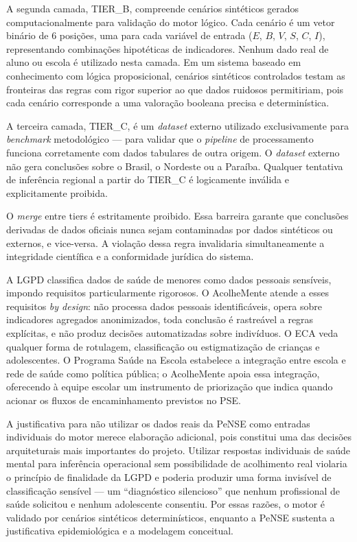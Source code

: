 \documentclass[
    12pt,
    openright,
    oneside,
    a4paper,
    english,
    brazil
]{abntex2}
\begin{document}
A segunda camada, TIER\_B, compreende cen\'arios sint\'eticos gerados computacionalmente para valida\c{c}\~ao do motor l\'ogico. Cada cen\'ario \'e um vetor bin\'ario de 6 posi\c{c}\~oes, uma para cada vari\'avel de entrada ($E$, $B$, $V$, $S$, $C$, $I$), representando combina\c{c}\~oes hipot\'eticas de indicadores. Nenhum dado real de aluno ou escola \'e utilizado nesta camada. Em um sistema baseado em conhecimento com l\'ogica proposicional, cen\'arios sint\'eticos controlados testam as fronteiras das regras com rigor superior ao que dados ruidosos permitiriam, pois cada cen\'ario corresponde a uma valora\c{c}\~ao booleana precisa e determin\'istica.

A terceira camada, TIER\_C, \'e um \textit{dataset} externo utilizado exclusivamente para \textit{benchmark} metodol\'ogico --- para validar que o \textit{pipeline} de processamento funciona corretamente com dados tabulares de outra origem. O \textit{dataset} externo n\~ao gera conclus\~oes sobre o Brasil, o Nordeste ou a Para\'iba. Qualquer tentativa de infer\^encia regional a partir do TIER\_C \'e logicamente inv\'alida e explicitamente proibida.

O \textit{merge} entre tiers \'e estritamente proibido. Essa barreira garante que conclus\~oes derivadas de dados oficiais nunca sejam contaminadas por dados sint\'eticos ou externos, e vice-versa. A viola\c{c}\~ao dessa regra invalidaria simultaneamente a integridade cient\'ifica e a conformidade jur\'idica do sistema.

A LGPD \cite{brasil_lgpd_2018} classifica dados de sa\'ude de menores como dados pessoais sens\'iveis, impondo requisitos particularmente rigorosos. O AcolheMente atende a esses requisitos \textit{by design}: n\~ao processa dados pessoais identific\'aveis, opera sobre indicadores agregados anonimizados, toda conclus\~ao \'e rastre\'avel a regras expl\'icitas, e n\~ao produz decis\~oes automatizadas sobre indiv\'iduos. O ECA \cite{brasil_eca_1990} veda qualquer forma de rotulagem, classifica\c{c}\~ao ou estigmatiza\c{c}\~ao de crian\c{c}as e adolescentes. O Programa Sa\'ude na Escola \cite{brasil_pse_2007} estabelece a integra\c{c}\~ao entre escola e rede de sa\'ude como pol\'itica p\'ublica; o AcolheMente apoia essa integra\c{c}\~ao, oferecendo \`a equipe escolar um instrumento de prioriza\c{c}\~ao que indica quando acionar os fluxos de encaminhamento previstos no PSE.

A justificativa para n\~ao utilizar os dados reais da PeNSE como entradas individuais do motor merece elabora\c{c}\~ao adicional, pois constitui uma das decis\~oes arquiteturais mais importantes do projeto. Utilizar respostas individuais de sa\'ude mental para infer\^encia operacional sem possibilidade de acolhimento real violaria o princ\'ipio de finalidade da LGPD e poderia produzir uma forma invis\'ivel de classifica\c{c}\~ao sens\'ivel --- um ``diagn\'ostico silencioso'' que nenhum profissional de sa\'ude solicitou e nenhum adolescente consentiu. Por essas raz\~oes, o motor \'e validado por cen\'arios sint\'eticos determin\'isticos, enquanto a PeNSE sustenta a justificativa epidemiol\'ogica e a modelagem conceitual.
\end{document}
